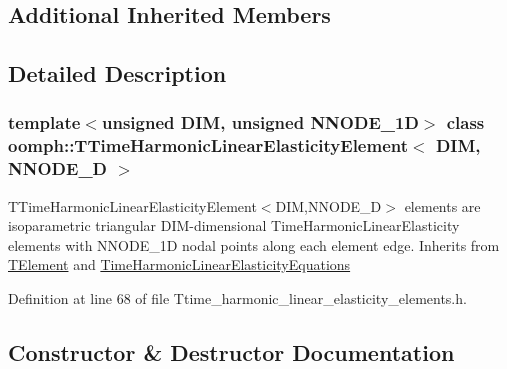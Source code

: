 \subsection*{Additional Inherited Members}


\subsection{Detailed Description}
\subsubsection*{template$<$unsigned D\+IM, unsigned N\+N\+O\+D\+E\+\_\+1D$>$\newline
class oomph\+::\+T\+Time\+Harmonic\+Linear\+Elasticity\+Element$<$ D\+I\+M, N\+N\+O\+D\+E\+\_\+D $>$}

T\+Time\+Harmonic\+Linear\+Elasticity\+Element$<$\+D\+I\+M,\+N\+N\+O\+D\+E\+\_\+D$>$ elements are isoparametric triangular D\+I\+M-\/dimensional Time\+Harmonic\+Linear\+Elasticity elements with N\+N\+O\+D\+E\+\_\+1D nodal points along each element edge. Inherits from \hyperlink{classoomph_1_1TElement}{T\+Element} and \hyperlink{classoomph_1_1TimeHarmonicLinearElasticityEquations}{Time\+Harmonic\+Linear\+Elasticity\+Equations} 

Definition at line 68 of file Ttime\+\_\+harmonic\+\_\+linear\+\_\+elasticity\+\_\+elements.\+h.



\subsection{Constructor \& Destructor Documentation}
\mbox{\label{classoomph_1_1TTimeHarmonicLinearElasticityElement_a28be2773ce1626dbae4d5222ebf599ad}} 
